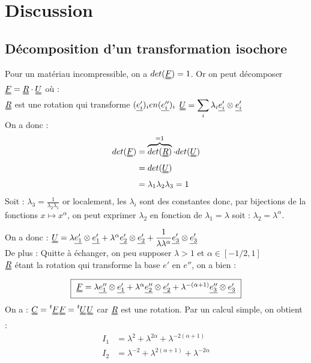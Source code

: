 \documentclass[a4paper,11pt]{article}
\newcommand{\trans}[1]{\tensor[^t]{#1}{}}
\newcommand{\SUM}{\displaystyle\sum}
\newcommand{\FRAC}{\displaystyle\frac}
\newcommand{\tens}{\uuline}
\begin{document}
\section{Discussion}
\subsection{Décomposition d'un transformation isochore}
Pour un matériau incompressible, on a $det(\tens{F}) = 1$.
Or on peut décomposer $\tens{F} = \tens{R}\cdot \tens{U}$ où :\\
$\tens{R}$ est une rotation qui transforme $(\uline{e'_i})_i en (\uline{e''_i})_i$
$\tens{U} = \SUM_i \lambda_i \uline{e'_i} \otimes \uline{e'_i}$
\\
On a donc :
\begin{align*}
det(\tens{F}) &= \overbrace{det(\tens{R})}^{=1} \cdot det(\tens{U}) \\
&= det(\tens{U}) \\
&= \lambda_1 \lambda_2 \lambda_3 = 1\\
\end{align*}
Soit : $\lambda_3 = \FRAC{1}{\lambda_2 \lambda_1}$ or localement, les $\lambda_i$ sont des constantes donc, par bijections de la fonctions $x \mapsto x^\alpha$, on peut exprimer $\lambda_2$ en fonction de $\lambda_1 = \lambda$ soit : $\lambda_2 = \lambda^\alpha$.

On a donc : $\tens{U} = \lambda \uline{e'_1} \otimes \uline{e'_1} + \lambda^\alpha \uline{e'_2} \otimes \uline{e'_2} + \FRAC{1}{\lambda \lambda^\alpha} \uline{e'_3} \otimes \uline{e'_3}$\\
De plus : Quitte à échanger, on peu supposer $\lambda >1$ et $\alpha \in [-1/2, 1]$\\
$\tens{R}$ étant la rotation qui transforme la base $e'$ en $e''$, on a bien :
\begin{equation}
\fbox{
$
\tens{F} = \lambda \uline{e''_1} \otimes \uline{e'_1} + \lambda^\alpha \uline{e''_2} \otimes \uline{e'_2} + \lambda^{-(\alpha +1)} \uline{e''_3} \otimes \uline{e'_3}
$
}
\end{equation}
On a : $\tens{C} = \trans{\tens{F}} \tens{F} = \trans{\tens{U}} \tens{U}$ car $\tens{R}$ est une rotation.
Par un calcul simple, on obtient :
\begin{align*}
I_1 &= \lambda^2 + \lambda^{2 \alpha} + \lambda^{- 2 (\alpha +1)} \\
I_2 &= \lambda^{-2} + \lambda^{2 (\alpha+1)} + \lambda^{ -2 \alpha} \\
\end{align*}
\end{document}
